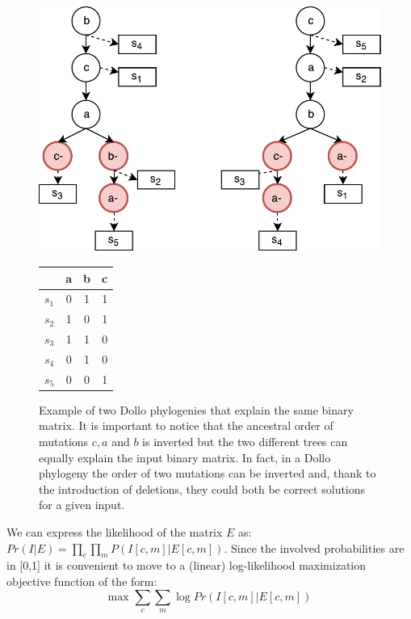 \documentclass[a4paper,USenglish]{article}
\theoremstyle{definition}
\begin{document}
\begin{figure}[!tb]
  \begin{minipage}{0.72\linewidth}
    \includegraphics[scale=.65]{img/dollo_non_unique}
\end{minipage}
\begin{minipage}{0.2\linewidth}
    \begin{tabular}[!t]{c|ccc}
            & a & b & c \\ \hline
            $s_1$ & 0 & 1 & 1 \\
            $s_2$ & 1 & 0 & 1 \\
            $s_3$ & 1 & 1 & 0 \\
            $s_4$ & 0 & 1 & 0 \\
            $s_5$ & 0 & 0 & 1
\end{tabular}
\end{minipage}
\caption{Example of two Dollo phylogenies that explain the same binary matrix. 
It is important to notice that the ancestral order of mutations $c,a$ and $b$ is inverted but the two different trees can equally explain the input binary matrix. In fact, in a Dollo phylogeny the order of two mutations can be inverted and, thank to the introduction of deletions, they could both be correct solutions for a given input.
}
\label{fig:dollo_non_unique}
\end{figure}

We can express the likelihood of the matrix $E$ as: $Pr(I|E) = \prod_{c} \prod_{m} P(I[c,m] | E[c,m])$.
Since the involved probabilities are in [0,1] it is convenient to move to a (linear) log-likelihood maximization objective function of the form:
\begin{equation}
\label{eq:log-likelihood}
    \mbox{max } \sum_c \sum_m \log Pr\left( I[c,m] | E[c,m]\right)
\end{equation}
\end{document}

